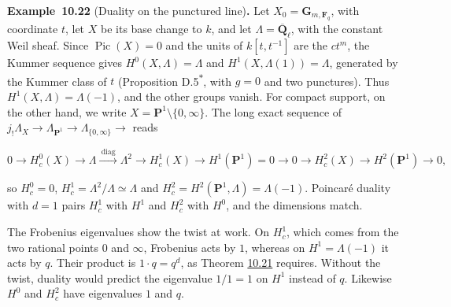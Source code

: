 \documentclass[11pt]{article}
\newenvironment{bpstatement}[2]{\par\addvspace{0.6\baselineskip}\noindent\textbf{#1}#2\textbf{.}\enspace\ignorespaces}
  {\par\addvspace{0.4\baselineskip}}
\newcommand{\bpout}[1]{#1\textsuperscript{\hyperlink{bp-outside}{\ensuremath{\ast}}}}
\begin{document}
\label{bp168}%
\begin{bpstatement}{Example~10.22}{ (Duality on the punctured line)}
Let \(X_0=\mathbf G_{m,\mathbf F_q}\), with coordinate \(t\), let \(X\) be its base change to \(k\), and let \(\Lambda=\overline{\mathbf Q}_\ell\), with the constant Weil sheaf. Since \(\operatorname{Pic}(X)=0\) and the units of \(k[t,t^{-1}]\) are the \(ct^m\), the Kummer sequence gives \(H^0(X,\Lambda)=\Lambda\) and \(H^1(X,\Lambda(1))=\Lambda\), generated by the Kummer class of \(t\) (Proposition \bpout{D.5}, with \(g=0\) and two punctures). Thus \(H^1(X,\Lambda)=\Lambda(-1)\), and the other groups vanish. For compact support, on the other hand, we write \(X=\mathbf P^1\setminus\{0,\infty\}\). The long exact sequence of \(j_!\Lambda_X\to\Lambda_{\mathbf P^1}\to\Lambda_{\{0,\infty\}}\to\) reads

\[
0\to H^0_c(X)\to\Lambda\xrightarrow{\ \text{diag}\ }\Lambda^2\to H^1_c(X)
\to H^1(\mathbf P^1)=0\to0\to H^2_c(X)\to H^2(\mathbf P^1)\to0,
\]

so \(H^0_c=0\), \(H^1_c=\Lambda^2/\Lambda\simeq\Lambda\) and \(H^2_c=H^2(\mathbf P^1,\Lambda)=\Lambda(-1)\). Poincaré duality with \(d=1\) pairs \(H^1_c\) with \(H^1\) and \(H^2_c\) with \(H^0\), and the dimensions match.

The Frobenius eigenvalues show the twist at work. On \(H^1_c\), which comes from the two rational points \(0\) and \(\infty\), Frobenius acts by \(1\), whereas on \(H^1=\Lambda(-1)\) it acts by \(q\). Their product is \(1\cdot q=q^d\), as Theorem \hyperref[bp165]{10.21} requires. Without the twist, duality would predict the eigenvalue \(1/1=1\) on \(H^1\) instead of \(q\). Likewise \(H^0\) and \(H^2_c\) have eigenvalues \(1\) and \(q\).
\end{bpstatement}
\end{document}
